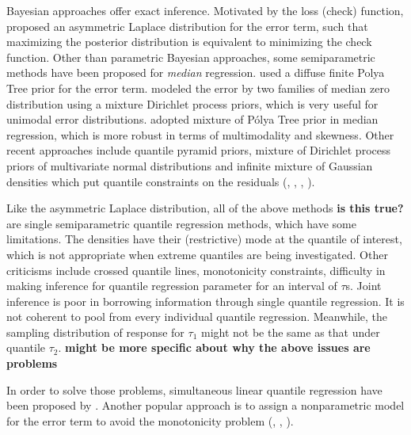 \documentclass[12pt]{article}
\newcommand{\polya}{P\'{o}lya}
\begin{document}
Bayesian approaches offer exact
inference. Motivated by the loss (check) function, \citet{yu2001}
proposed an asymmetric Laplace distribution for the error term,
such that maximizing the posterior distribution  is equivalent to
minimizing the check function. Other than parametric Bayesian
approaches, some semiparametric methods have been proposed for {\em median}
regression. \citet{walker1999}  used a diffuse finite Polya Tree prior
for the error term. \citet{kottas2001}
modeled the error by two families of median zero distribution using a 
mixture Dirichlet process priors, which is very useful for unimodal
error distributions. \citet{hanson2002}
adopted mixture of \polya{} Tree prior in median regression,
which is
more robust in terms of multimodality and skewness. Other recent approaches
include quantile pyramid priors, mixture of Dirichlet process priors
of multivariate normal distributions and infinite mixture of Gaussian
densities which put quantile constraints on the residuals
(\citet{hjort2007}, \citet{hjort2009}, \citet{kottas2009},
\citet{reich2010}). 

Like the asymmetric Laplace distribution, all of the above methods {\bf is this true?} are single semiparametric
quantile regression  methods,
which have some limitations. The densities have their (restrictive) mode at
the quantile of interest, which is not appropriate when extreme
quantiles are being investigated. Other criticisms include crossed
quantile lines, monotonicity constraints, difficulty in making
inference for quantile regression parameter for an interval of
$\tau$s. Joint inference is poor in borrowing information through
single quantile regression. It is not coherent to pool from every
individual quantile regression. Meanwhile, the sampling distribution
of response for $\tau_1$ might not be the same as that under quantile $\tau_2$. {\bf might be more specific about why the above issues are problems}

In order to solve those problems, simultaneous linear quantile
regression have been proposed by \citet{tokdar2011}. 
Another popular approach is to assign a nonparametric model for the
error term to avoid the monotonicity problem (\citet{scaccia2003},
\citet{geweke2007}, \citet{taddy2010}).
\end{document}
